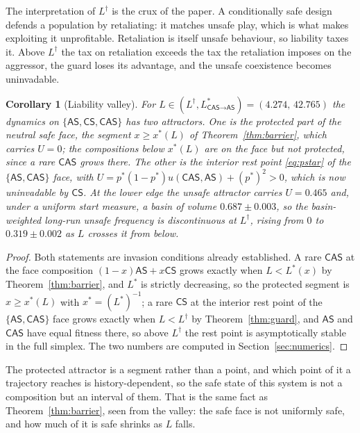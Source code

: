 \documentclass[11pt,a4paper]{article}
\newtheorem{corollary}[theorem]{Corollary}
\theoremstyle{definition}
\newcommand{\AS}{\textsf{AS}}
\newcommand{\CS}{\textsf{CS}}
\newcommand{\CAS}{\textsf{CAS}}
\begin{document}
The interpretation of $L^{\dagger}$ is the crux of the paper. A conditionally
safe design defends a population by retaliating: it matches unsafe play, which
is what makes exploiting it unprofitable. Retaliation is itself unsafe
behaviour, so liability taxes it. Above $L^{\dagger}$ the tax on retaliation
exceeds the tax the retaliation imposes on the aggressor, the guard loses its
advantage, and the unsafe coexistence becomes uninvadable.

\begin{corollary}[Liability valley]\label{cor:valley}
For $L\in(L^{\dagger},L^{*}_{\CAS\to\AS})=(4.274,\,42.765)$ the dynamics on
$\{\AS,\CS,\CAS\}$ has two attractors. One is the protected part of the
neutral safe face, the segment $x\ge x^{*}(L)$ of Theorem~\ref{thm:barrier},
which carries $U=0$; the compositions below $x^{*}(L)$ are on the face but
not protected, since a rare $\CAS$ grows there. The other is the interior rest
point \eqref{eq:pstar} of the $\{\AS,\CAS\}$ face, with
$U=p^{*}(1-p^{*})u(\CAS,\AS)+(p^{*})^{2}>0$, which is now uninvadable by
$\CS$. At the lower edge the unsafe attractor carries $U=0.465$ and, under a
uniform start measure, a basin of volume $0.687\pm0.003$, so the
basin-weighted long-run unsafe frequency is discontinuous at $L^{\dagger}$,
rising from $0$ to $0.319\pm0.002$ as $L$ crosses it from below.
\end{corollary}

\begin{proof}
Both statements are invasion conditions already established. A rare $\CAS$ at
the face composition $(1-x)\AS+x\CS$ grows exactly when $L<L^{*}(x)$ by
Theorem~\ref{thm:barrier}, and $L^{*}$ is strictly decreasing, so the
protected segment is $x\ge x^{*}(L)$ with $x^{*}=(L^{*})^{-1}$; a rare $\CS$
at the interior rest point of the $\{\AS,\CAS\}$ face grows exactly when
$L<L^{\dagger}$ by Theorem~\ref{thm:guard}, and $\AS$ and $\CAS$ have equal
fitness there, so above $L^{\dagger}$ the rest point is asymptotically stable
in the full simplex. The two numbers are computed in
Section~\ref{sec:numerics}.
\end{proof}

The protected attractor is a segment rather than a point, and which point of
it a trajectory reaches is history-dependent, so the safe state of this system
is not a composition but an interval of them. That is the same fact as
Theorem~\ref{thm:barrier}, seen from the valley: the safe face is not
uniformly safe, and how much of it is safe shrinks as $L$ falls.
\end{document}
